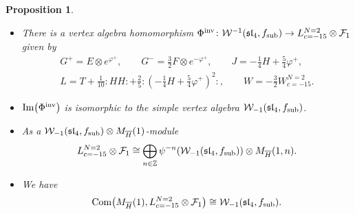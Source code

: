 \documentclass[pdftex]{sigma}
\numberwithin{equation}{section}
\newcommand{\Z}{\mathbb Z}
\newcommand{\F}{\mathcal F}
\newtheorem{Proposition}[Theorem]{Proposition}
\begin{document}
\begin{Proposition} \label{ulaganje-2}
\quad
\begin{itemize}\itemsep=0pt
	\item[$(1)$] There is a vertex algebra homomorphism $\Phi^{\rm inv} \colon \mathcal{W}^{-1}(\mathfrak{sl}_4, f_{\rm sub}) \rightarrow L^{N=2}_{c=-15} \otimes \F_{1}$ given by
	\begin{gather*}
		G^+ = E\otimes e^{\varphi^+}, \qquad
		G^- = \frac{3}{2} F \otimes e^{-\varphi^+}, \qquad
		J = - \frac{1}{4} H + \frac{5}{4} \varphi^+, \\
		L = T + \frac{1} {10} {:}H H{:}+ \frac{2}{5} {:}\left( - \frac{1}{4} H + \frac{5}{4} \varphi^+\right)^2{:}, \qquad
		W = -\frac{3}{2} W^{N=2}_{c=-15}.
	\end{gather*}
	
\item[$(2)$] $\operatorname{Im} \bigl(\Phi^{\rm inv}\bigr) $ is isomorphic to the simple vertex algebra $ \mathcal{W}_{-1}(\mathfrak{sl}_4, f_{\rm sub})$.

\item[$(3)$]
 As a $ \mathcal{W}_{-1}(\mathfrak{sl}_4, f_{\rm sub})\otimes M_{\overline{H}} (1)$-module
\[
L^{N=2}_{c=-15} \otimes \F_{1} \cong \bigoplus_{n\in {\Z} }
 \psi^{-n} ( \mathcal{W}_{-1}(\mathfrak{sl}_4, f_{\rm sub})) \otimes M_{\overline{H}} (1, n).
 \]
 \item[$(4)$] We have
\[
 \operatorname{Com} \bigl(M_{\overline{H}}(1), L^{N=2}_{c=-15} \otimes \F_{1}\bigr) \cong \mathcal{W}_{-1}(\mathfrak{sl}_4, f_{\rm sub}).
 \]
 \end{itemize}
	
\end{Proposition}
\end{document}
